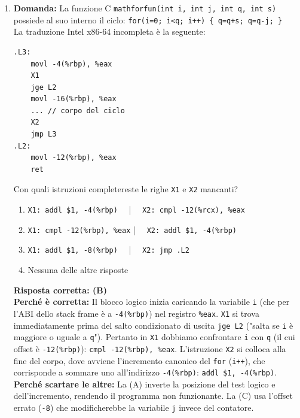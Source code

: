 \documentclass[12pt, a4paper]{article}
\begin{document}
\begin{enumerate}
    \item \textbf{Domanda:} La funzione C \texttt{mathforfun(int i, int j, int q, int s)} possiede al suo interno il ciclo:
    \texttt{for(i=0; i<q; i++) \{ q=q+s; q=q-j; \}} \\
    La traduzione Intel x86-64 incompleta è la seguente:
\begin{verbatim}
.L3:
    movl -4(%rbp), %eax
    X1
    jge L2
    movl -16(%rbp), %eax
    ... // corpo del ciclo
    X2
    jmp L3
.L2: 
    movl -12(%rbp), %eax
    ret
\end{verbatim}
    Con quali istruzioni completereste le righe \texttt{X1} e \texttt{X2} mancanti?
    \begin{enumerate}[label=(\Alph*)]
        \item \texttt{X1: addl \$1, -4(\%rbp)} \ \  | \ \ \texttt{X2: cmpl -12(\%rcx), \%eax}
        \item \texttt{X1: cmpl -12(\%rbp), \%eax} | \ \ \texttt{X2: addl \$1, -4(\%rbp)}
        \item \texttt{X1: addl \$1, -8(\%rbp)} \ \  | \ \ \texttt{X2: jmp .L2}
        \item Nessuna delle altre risposte
    \end{enumerate}
    \textbf{Risposta corretta: (B)} \\
    \textbf{Perché è corretta:} Il blocco logico inizia caricando la variabile \texttt{i} (che per l'ABI dello stack frame è a \texttt{-4(\%rbp)}) nel registro \texttt{\%eax}. \texttt{X1} si trova immediatamente prima del salto condizionato di uscita \texttt{jge L2} ("salta se \texttt{i} è maggiore o uguale a \texttt{q}"). Pertanto in \texttt{X1} dobbiamo confrontare \texttt{i} con \texttt{q} (il cui offset è \texttt{-12(\%rbp)}): \texttt{cmpl -12(\%rbp), \%eax}. L'istruzione \texttt{X2} si colloca alla fine del corpo, dove avviene l'incremento canonico del \texttt{for} (\texttt{i++}), che corrisponde a sommare uno all'indirizzo \texttt{-4(\%rbp)}: \texttt{addl \$1, -4(\%rbp)}. \\
    \textbf{Perché scartare le altre:} La (A) inverte la posizione del test logico e dell'incremento, rendendo il programma non funzionante. La (C) usa l'offset errato (\texttt{-8}) che modificherebbe la variabile \texttt{j} invece del contatore.



\end{enumerate}
\end{document}
